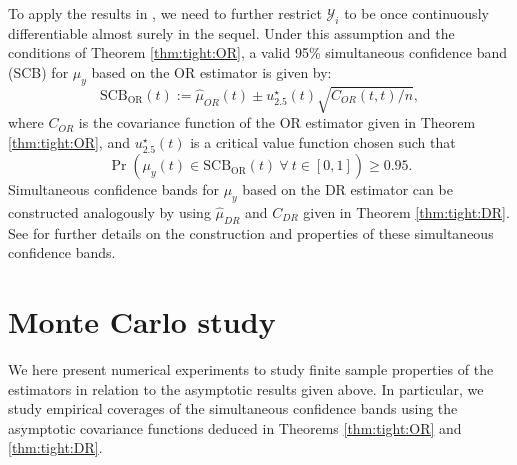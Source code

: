 \documentclass[12pt, A4]{article}
\begin{document}
        To apply the results in \cite{Liebl}, we need to further restrict $\mathcal{Y}_i$ to be once continuously differentiable almost surely in the sequel. 
        Under this assumption and the conditions of Theorem \ref{thm:tight:OR}, a valid 95\% simultaneous confidence band (SCB) for $\mu_{y}$ based on the OR estimator is given by:
            \begin{equation}\label{equ:ffscb}
                \mathrm{SCB_{OR}}(t) := \hat{\mu}_{OR}(t) \pm \mathit{u}^\star_{2.5}(t) \sqrt{C_{OR}(t,t) / n}, 
            \end{equation}
        where $C_{OR}$ is the covariance function of the OR estimator given in Theorem \ref{thm:tight:OR}, and $\mathit{u}^\star_{2.5}(t)$ is a critical value function chosen such that 
            \begin{equation}\label{equ:coverage}
                \Pr\left( \mu_y(t) \in \mathrm{SCB_{OR}}(t) \ \forall \ t \in [0,1]  \right) \geq 0.95.
            \end{equation}
        Simultaneous confidence bands for $\mu_{y}$ based on the DR estimator can be constructed analogously by using $\hat{\mu}_{DR}$ and $C_{DR}$ given in Theorem \ref{thm:tight:DR}. 
        See \cite{Liebl2, Liebl} for further details on the construction and properties of these simultaneous confidence bands.
    \section{Monte Carlo study}
        We here present numerical experiments to study finite sample properties of the estimators in relation to the asymptotic results given above. 
        In particular, we study empirical coverages of the simultaneous confidence bands using the asymptotic covariance functions deduced in Theorems \ref{thm:tight:OR} and \ref{thm:tight:DR}.
\end{document}
